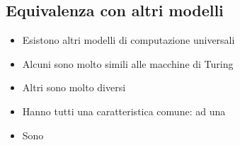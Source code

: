 
\subsection{Equivalenza con altri modelli}
\begin{itemize}
   \item Esistono altri modelli di computazione universali
   \item Alcuni sono molto simili alle macchine di Turing
   \item Altri sono molto diversi 
   \item Hanno tutti una caratteristica comune:
       ad una  
   \item Sono  
\end{itemize}
